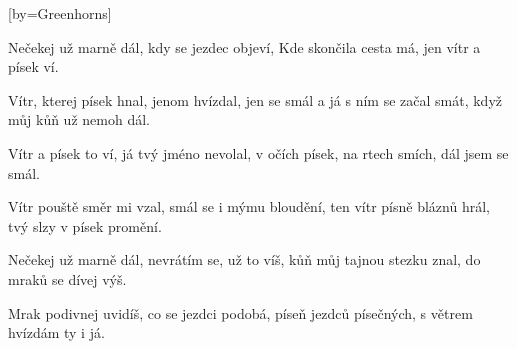 [by={Greenhorns}]

\beginverse{}
Nečekej už marně dál,
kdy se jezdec objeví,
Kde skončila cesta má,
jen vítr a písek ví.
\endverse{}

\beginverse{}
Vítr, kterej písek hnal,
jenom hvízdal, jen se smál
a já s ním se začal smát,
když můj kůň už nemoh dál.
\endverse{}

\beginchorus{}
Vítr a písek to ví,
já tvý jméno nevolal,
v očích písek, na rtech smích,
dál jsem se smál.
\endchorus{}

\beginverse{}
Vítr pouště směr mi vzal,
smál se i mýmu bloudění,
ten vítr písně bláznů hrál,
tvý slzy v písek promění.
\endverse{}

\beginchorus{}
\phantom{}
\endchorus{}

\beginverse{}
Nečekej už marně dál,
nevrátím se, už to víš,
kůň můj tajnou stezku znal,
do mraků se dívej výš.
\endverse{}

\beginverse{}
Mrak podivnej uvidíš,
co se jezdci podobá,
píseň jezdců písečných,
s větrem hvízdám ty i já.
\endverse{}

\endsong{}
